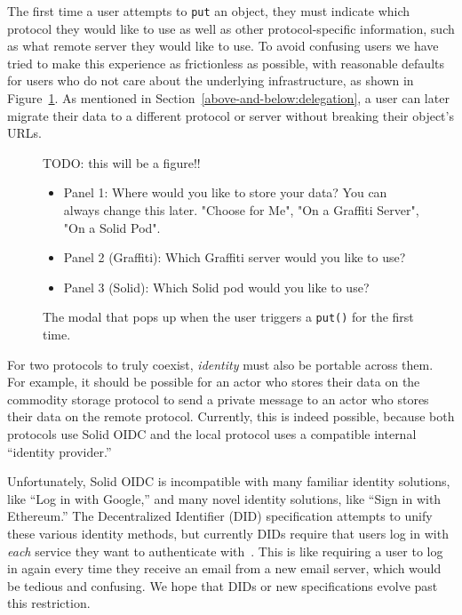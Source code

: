 The first time a user attempts to \texttt{put} an object,
they must indicate which protocol they would like to use
as well as other protocol-specific information, such as what
remote server they would like to use.
To avoid confusing users we have tried to make this experience
as frictionless as possible, with reasonable defaults for
users who do not care about the underlying infrastructure,
as shown in Figure~\ref{above-and-below:choose-protocol}.
As mentioned in Section~\ref{above-and-below:delegation},
a user can later migrate their data to a different protocol
or server without breaking their object's URLs.

\begin{figure}
    \label{above-and-below:choose-protocol}
    TODO: this will be a figure!!
    \begin{itemize}
    \item
    Panel 1: Where would you like to store your data? You can always change this later.
    "Choose for Me", "On a Graffiti Server", "On a Solid Pod".
    \item
    Panel 2 (Graffiti): Which Graffiti server would you like to use?
    \item
    Panel 3 (Solid): Which Solid pod would you like to use?
    \end{itemize}
    \caption{The modal that pops up when the user triggers a \texttt{put()} for the first time.}
\end{figure}

For two protocols to truly coexist,
\emph{identity} must also be portable across them.
For example, it should be possible for an actor who stores their data on
the commodity storage protocol to send a private message to an
actor who stores their data on the remote protocol.
Currently, this is indeed possible, because both protocols use Solid OIDC
and the local protocol uses a compatible internal ``identity provider.''

Unfortunately, Solid OIDC is incompatible with many familiar
identity solutions, like ``Log in with Google,''
and many novel identity solutions, like ``Sign in with Ethereum.''
The Decentralized Identifier (DID) specification attempts to unify
these various identity methods, but currently DIDs require that
users log in with \emph{each} service they want to authenticate with~\cite{dids}.
This is like requiring a user to log in again every time
they receive an email from a new email server, which would
be tedious and confusing.
We hope that DIDs or new specifications evolve past this restriction.

